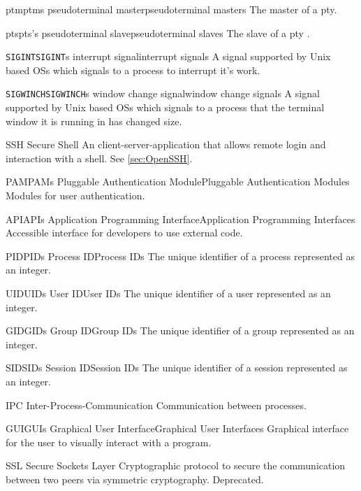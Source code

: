 %
{ptm}{ptms}%
{pseudoterminal master}{pseudoterminal masters}%
{The master of a \gls{pty}.}

%
{pts}{pts's}%
{pseudoterminal slave}{pseudoterminal slaves}%
{The slave of a \gls{pty} \citep{pts}.}

%
{\texttt{SIGINT}}{\texttt{SIGINT}s}%
{interrupt signal}{interrupt signals}%
{A signal supported by \gls{Unix} based \glspl{OS} which signals to a process to interrupt it's work.}

%
{\texttt{SIGWINCH}}{\texttt{SIGWINCH}s}%
{window change signal}{window change signals}%
{A signal supported by \gls{Unix} based \glspl{OS} which signals to a process that the terminal window it is running in has changed size.}

%
{SSH}{}%
{Secure Shell}{}%
{An client-server-application that allows remote login and interaction with a \gls{shell}. See \ref{sec:OpenSSH}.}

%
{PAM}{PAMs}%
{Pluggable Authentication Module}{Pluggable Authentication Modules}%
{Modules for user authentication.}

%
{API}{APIs}%
{Application Programming Interface}{Application Programming Interfaces}%
{Accessible interface for developers to use external code.}

%
{PID}{PIDs}%
{Process ID}{Process IDs}%
{The unique identifier of a process represented as an integer.}

%
{UID}{UIDs}%
{User ID}{User IDs}%
{The unique identifier of a user represented as an integer.}

%
{GID}{GIDs}%
{Group ID}{Group IDs}%
{The unique identifier of a group represented as an integer.}

%
{SID}{SIDs}%
{Session ID}{Session IDs}%
{The unique identifier of a session represented as an integer.}

%
{IPC}{}%
{Inter-Process-Communication}{}%
{Communication between processes.}

%
{GUI}{GUIs}%
{Graphical User Interface}{Graphical User Interfaces}%
{Graphical interface for the user to visually interact with a program.}

%
{SSL}{}%
{Secure Sockets Layer}{}%
{Cryptographic protocol to secure the communication between two peers via symmetric cryptography. Deprecated.}

